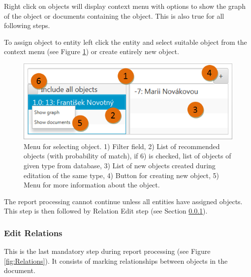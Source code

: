 Right click on objects will display context menu with options to show the graph
of the object or documents containing the object. This is also true for all following steps.

To assign object to entity left click the entity and select suitable object
from the context menu (see Figure \ref{fig:ObjectMenu}) or create entirely new
object.

\begin{figure}[!htb]
        \centering
        \includegraphics[width=\textwidth]{Images/objectmenu}
        \caption{Menu for selecting object. 1) Filter field, 2) List of
		 recommended objects (with probability of match), if 6) is checked, list
		 of objects of given type from database, 3) List of new objects created
		 during editation of the same type, 4) Button for creating new object,
		 5) Menu for more information about the object.}
        \label{fig:ObjectMenu}
\end{figure}

The report processing cannot continue unless all entities have assigned
objects. This step is then followed by Relation Edit step (see Section
\ref{sssec:EditRelations}).

\subsubsection{Edit Relations}
\label{sssec:EditRelations}

This is the last mandatory step during report processing (see Figure
\ref{fig:Relations}). It consists of marking relationships between objects in
the document.

